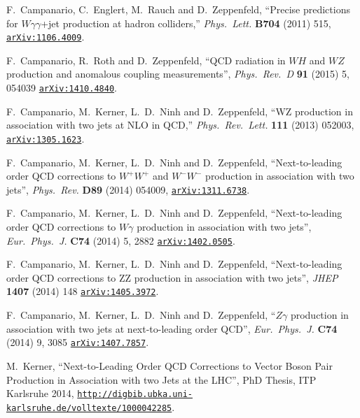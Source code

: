 \documentclass[english,12pt]{article}
\begin{document}
\begin{thebibliography}{10}
  F.~Campanario, C.~Englert, M.~Rauch and D.~Zeppenfeld,
  ``Precise predictions for $W \gamma \gamma$+jet production at hadron colliders,''
  {\em Phys.\ Lett.} {\bf B704} (2011) 515,
  \href{http://www.arXiv.org/abs/1106.4009}{{\tt arXiv:1106.4009}}.

  F.~Campanario, R.~Roth and D.~Zeppenfeld,
  ``QCD radiation in $WH$ and $WZ$ production and anomalous coupling measurements'',
  {\em Phys.\ Rev.\ D} {\bf 91} (2015) 5,  054039
  \href{http://www.arXiv.org/abs/1410.4840}{{\tt arXiv:1410.4840}}.
  
  F.~Campanario, M.~Kerner, L.~D.~Ninh and D.~Zeppenfeld,
  ``WZ production in association with two jets at NLO in QCD,''
  {\em Phys.\ Rev.\ Lett.} {\bf 111} (2013) 052003,
  \href{http://arXiv.org/abs/1305.1623} {{\tt arXiv:1305.1623}}.

  F.~Campanario, M.~Kerner, L.~D.~Ninh and D.~Zeppenfeld,
  ``Next-to-leading order QCD corrections to $W^+W^+$ and $W^-W^-$ production in association with two jets'',
  {\em Phys.\ Rev.} {\bf D89} (2014) 054009,
  \href{http://arXiv.org/abs/1311.6738} {{\tt arXiv:1311.6738}}.

  F.~Campanario, M.~Kerner, L.~D.~Ninh and D.~Zeppenfeld,
  ``Next-to-leading order QCD corrections to $W \gamma$ production in association with two jets'',
  {\em Eur.\ Phys.\ J.} {\bf C74} (2014) 5, 2882 
  \href{http://arXiv.org/abs/1402.0505} {{\tt arXiv:1402.0505}}.

  F.~Campanario, M.~Kerner, L.~D.~Ninh and D.~Zeppenfeld,
  ``Next-to-leading order QCD corrections to ZZ production in association with two jets'',
  {\em JHEP} {\bf 1407} (2014) 148 
  \href{http://arXiv.org/abs/1405.3972} {{\tt arXiv:1405.3972}}.

  F.~Campanario, M.~Kerner, L.~D.~Ninh and D.~Zeppenfeld,
  ``$Z\gamma$ production in association with two jets at next-to-leading order QCD'',
  {\em Eur.\ Phys.\ J.} {\bf C74} (2014) 9, 3085 
  \href{http://arXiv.org/abs/1407.7857} {{\tt arXiv:1407.7857}}.

  M.~Kerner,
  ``Next-to-Leading Order QCD Corrections to Vector Boson Pair Production in Association with two Jets at the LHC'',
  {PhD Thesis, ITP Karlsruhe 2014}, 
\href{http://digbib.ubka.uni-karlsruhe.de/volltexte/1000042285}{{\tt http://digbib.ubka.uni-karlsruhe.de/volltexte/1000042285}}.


\end{thebibliography}
\end{document}
